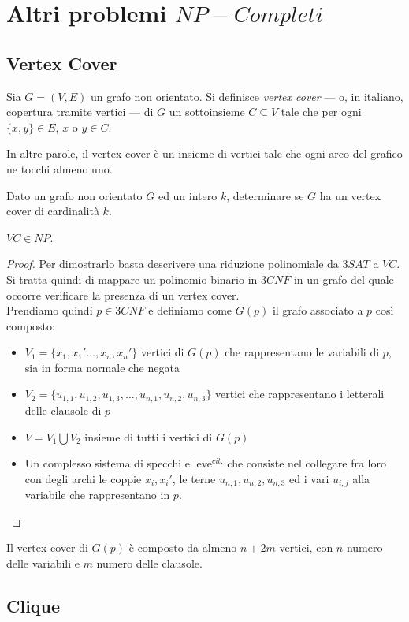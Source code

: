 \section{Altri problemi $NP-Completi$}

\subsection{Vertex Cover}

Sia $G = (V, E)$ un grafo non orientato. Si definisce \textit{vertex cover} --- o, in italiano, copertura tramite vertici --- di $G$ un sottoinsieme $C \subseteq V$ tale che per ogni $\{x, y\} \in E$, $x \text{ o } y \in C$.

In altre parole, il vertex cover è un insieme di vertici tale che ogni arco del grafico ne tocchi almeno uno.

\vspace{0.25cm}

\begin{defn}
    Dato un grafo non orientato $G$ ed un intero $k$, determinare se $G$ ha un vertex cover di cardinalità $k$.
\end{defn}

\vspace{0.25cm}

\begin{lemm}
	$VC \in NP$.
\end{lemm}

\begin{proof}
	Per dimostrarlo basta descrivere una riduzione polinomiale da $3SAT$ a $VC$. Si tratta quindi di mappare un polinomio binario in $3CNF$ in un grafo del quale occorre verificare la presenza di un vertex cover. \\
    Prendiamo quindi $p \in 3CNF$ e definiamo come $G(p)$ il grafo associato a $p$ così composto:
    \begin{itemize}
        \item $V_1 = \{x_1, x_1' \ldots , x_n, x_n'\}$ vertici di $G(p)$ che rappresentano le variabili di $p$, sia in forma normale che negata
        \item $V_2 = \{u_{1,1}, u_{1,2}, u_{1,3}, \ldots , u_{n,1}, u_{n,2}, u_{n,3}\}$ vertici che rappresentano i letterali delle clausole di $p$
        \item $V = V_1 \bigcup V_2$ insieme di tutti i vertici di $G(p)$
        \item Un complesso sistema di specchi e leve$^{cit.}$ che consiste nel collegare fra loro con degli archi le coppie $x_i, x_i'$, le terne $u_{n,1}, u_{n,2}, u_{n,3}$ ed i vari $u_{i,j}$ alla variabile che rappresentano in $p$.
    \end{itemize}
\end{proof}

\begin{remark}
	Il vertex cover di $G(p)$ è composto da almeno $n+2m$ vertici, con $n$ numero delle variabili e $m$ numero delle clausole.
\end{remark}

\subsection{Clique}

